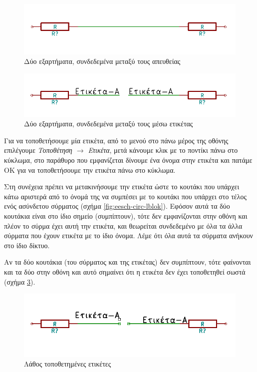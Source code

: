 \documentclass[a4paper]{article}
\begin{document}
\begin{figure}
  \begin{center}
    \includegraphics[width=.35\textwidth]{img/eesch-circ-twoconnnolbl.png}
    \caption{Δύο εξαρτήματα, συνδεδεμένα μεταξύ τους απευθείας}
    \label{fig:eesch-circ-twoconnlbl}
  \end{center}
\end{figure}

\begin{figure}
  \begin{center}
    \includegraphics[width=.35\textwidth]{img/eesch-circ-twoconnlbl.png}
    \caption{Δύο εξαρτήματα, συνδεδεμένα μεταξύ τους μέσω ετικέτας}
    \label{fig:eesch-circ-twoconnnolbl}
  \end{center}
\end{figure}

Για να τοποθετήσουμε μία ετικέτα, από το μενού στο πάνω μέρος της οθόνης επιλέγουμε \textit{Τοποθέτηση $\rightarrow$ Ετικέτα}, μετά κάνουμε κλικ με το ποντίκι πάνω στο κύκλωμα, στο παράθυρο που εμφανίζεται δίνουμε ένα όνομα στην ετικέτα και πατάμε ΟΚ για να τοποθετήσουμε την ετικέτα πάνω στο κύκλωμα. 

Στη συνέχεια πρέπει να μετακινήσουμε την ετικέτα ώστε το κουτάκι που υπάρχει κάτω αριστερά από το όνομά της να συμπέσει με το κουτάκι που υπάρχει στο τέλος ενός ασύνδετου σύρματος (σχήμα \ref{fig:eesch-circ-lblok}). Εφόσον αυτά τα δύο κουτάκια είναι στο ίδιο σημείο (συμπίπτουν), τότε δεν εμφανίζονται στην οθόνη και πλέον το σύρμα έχει αυτή την ετικέτα, και θεωρείται συνδεδεμένο με όλα τα άλλα σύρματα που έχουν ετικέτα με το ίδιο όνομα. Λέμε ότι όλα αυτά τα σύρματα ανήκουν στο ίδιο δίκτυο. 

Αν τα δύο κουτάκια (του σύρματος και της ετικέτας) δεν συμπίπτουν, τότε φαίνονται και τα δύο στην οθόνη και αυτό σημαίνει ότι η ετικέτα δεν έχει τοποθετηθεί σωστά (σχήμα \ref{fig:eesch-circ-lblnotok}).

\begin{figure}
  \begin{center}
    \includegraphics[width=.35\textwidth]{img/eesch-circ-lblnotok.png}
    \caption{Λάθος τοποθετημένες ετικέτες}
    \label{fig:eesch-circ-lblnotok}
  \end{center}
\end{figure}
\end{document}
